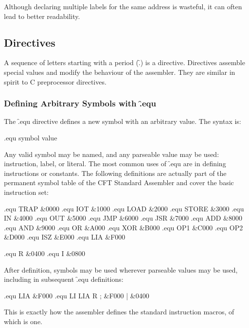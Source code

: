 Although declaring multiple labels for the same address is wasteful, it can
often lead to better readability.

\subsection{Directives}

A sequence of letters starting with a period (\f{.}) is a directive. Directives
assemble special values and modify the behaviour of the assembler. They are
similar in spirit to C preprocessor directives.



\subsubsection{Defining Arbitrary Symbols with \f{.equ}}

The \f{.equ} directive defines a new symbol with an arbitrary value. The syntax is:

\begin{cftasmcode}
.equ symbol value
\end{cftasmcode}

Any valid symbol may be named, and any parseable value may be used:
instruction, label, or literal. The most common uses of \f{.equ} are in
defining instructions or constants. The following definitions are actually part
of the permanent symbol table of the CFT Standard Assembler and cover the basic
instruction set:

\begin{cftasmcode}
.equ TRAP  &0000
.equ IOT   &1000
.equ LOAD  &2000
.equ STORE &3000
.equ IN    &4000
.equ OUT   &5000
.equ JMP   &6000
.equ JSR   &7000
.equ ADD   &8000
.equ AND   &9000
.equ OR    &A000
.equ XOR   &B000
.equ OP1   &C000
.equ OP2   &D000
.equ ISZ   &E000
.equ LIA   &F000

.equ R     &0400
.equ I     &0800
\end{cftasmcode}

After definition, symbols may be used wherever parseable values may be used,
including in subsequent \f{.equ definitions}:

\begin{cftasmcode}
.equ LIA   &F000
.equ LI    LIA  R   ; &F000 | &0400
\end{cftasmcode}

This is exactly how the assembler defines the standard instruction macros, of
which  is one.



